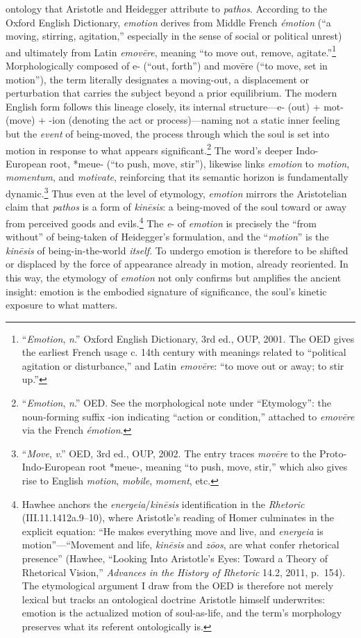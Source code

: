 \documentclass{article}
\begin{document}
ontology that Aristotle and Heidegger attribute to \textit{pathos}. According to the Oxford English Dictionary, \textit{emotion} derives from Middle French \textit{émotion} (“a moving, stirring, agitation,” especially in the sense of social or political unrest) and ultimately from Latin \textit{emovēre}, meaning “to move out, remove, agitate.”\footnote{“\textit{Emotion}, \textit{n}.” Oxford English Dictionary, 3rd ed., OUP, 2001. The OED gives the earliest French usage c. 14th century with meanings related to “political agitation or disturbance,” and Latin \textit{emovēre}: “to move out or away; to stir up.”} Morphologically composed of e- (“out, forth”) and movēre (“to move, set in motion”), the term literally designates a moving-out, a displacement or perturbation that carries the subject beyond a prior equilibrium. The modern English form follows this lineage closely, its internal structure—e- (out) + mot- (move) + -ion (denoting the act or process)—naming not a static inner feeling but the \textit{event} of being-moved, the process through which the soul is set into motion in response to what appears significant.\footnote{“\textit{Emotion}, \textit{n}.” OED. See the morphological note under “Etymology”: the noun-forming suffix -ion indicating “action or condition,” attached to \textit{emovēre} via the French \textit{émotion}.} The word’s deeper Indo-European root, *meue- (“to push, move, stir”), likewise links \textit{emotion} to \textit{motion}, \textit{momentum}, and \textit{motivate}, reinforcing that its semantic horizon is fundamentally dynamic.\footnote{“\textit{Move}, \textit{v}.” OED, 3rd ed., OUP, 2002. The entry traces \textit{movēre} to the Proto-Indo-European root *meue-, meaning “to push, move, stir,” which also gives rise to English \textit{motion}, \textit{mobile}, \textit{moment}, etc.}  Thus even at the level of etymology, \textit{emotion} mirrors the Aristotelian claim that \textit{pathos} is a form of \textit{kinēsis}: a being-moved of the soul toward or away from perceived goods and evils.\footnote{Hawhee anchors the \textit{energeia}/\textit{kinēsis} identification in the \textit{Rhetoric} (III.11.1412a.9--10), where Aristotle's reading of Homer culminates in the explicit equation: ``He makes everything move and live, and \textit{energeia} is motion''---``Movement and life, \textit{kinēsis} and \textit{zōos}, are what confer rhetorical presence'' (Hawhee, ``Looking Into Aristotle's Eyes: Toward a Theory of Rhetorical Vision,'' \textit{Advances in the History of Rhetoric} 14.2, 2011, p.~154). The etymological argument I draw from the OED is therefore not merely lexical but tracks an ontological doctrine Aristotle himself underwrites: emotion is the actualized motion of soul-as-life, and the term's morphology preserves what its referent ontologically is.} The \textit{e}- of \textit{emotion} is precisely the ``from without'' of being-taken of Heidegger's formulation, and the ``\textit{motion}'' is the \textit{kinēsis} of being-in-the-world \textit{itself}. To undergo emotion is therefore to be shifted or displaced by the force of appearance already in motion, already reoriented. In this way, the etymology of \textit{emotion} not only confirms but amplifies the ancient insight: emotion is the embodied signature of significance, the soul’s kinetic exposure to what matters. 
\end{document}
